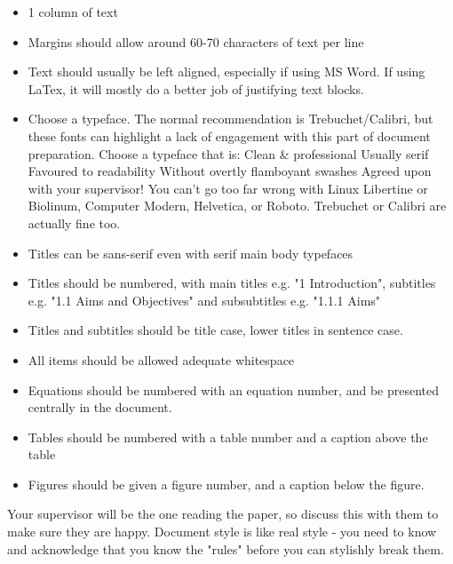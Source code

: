 \begin{itemize}
    \item 1 column of text
    \item Margins should allow around 60-70 characters of text per line
    \item Text should usually be left aligned, especially if using MS Word. If using LaTex, it will mostly do a better job of justifying text blocks.
    \item Choose a typeface. The normal recommendation is Trebuchet/Calibri, but these fonts can highlight a lack of engagement with this part of document preparation. Choose a typeface that is:
    \subitem Clean \& professional
    \subitem Usually serif
    \subitem Favoured to readability
    \subitem Without overtly flamboyant swashes
    \subitem Agreed upon with your supervisor!
    \subitem You can't go too far wrong with Linux Libertine or Biolinum, Computer Modern, Helvetica, or Roboto. Trebuchet or Calibri are actually fine too.

    \item Titles can be sans-serif even with serif main body typefaces
    \item Titles should be numbered, with main titles e.g. "1 Introduction", subtitles e.g. "1.1 Aims and Objectives" and subsubtitles e.g. "1.1.1 Aims"
    \item Titles and subtitles should be title case, lower titles in sentence case.
    \item All items should be allowed adequate whitespace
    \item Equations should be numbered with an equation number, and be presented centrally in the document.
    \item Tables should be numbered with a table number and a caption above the table
    \item Figures should be given a figure number, and a caption below the figure.

\end{itemize}

Your supervisor will be the one reading the paper, so discuss this with them to make sure they are happy. Document style is like real style - you need to know and acknowledge that you know the "rules" before you can stylishly break them.